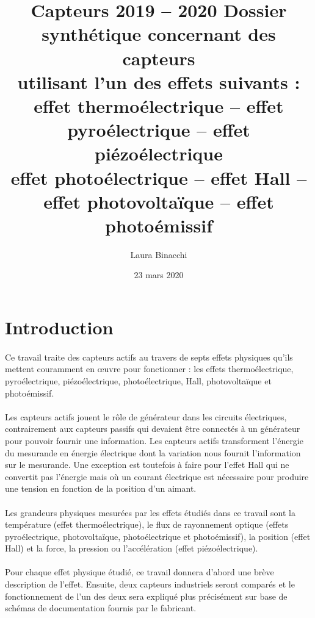 \documentclass{article}
\title{Capteurs 2019 -- 2020\bigbreak \bigbreak
    \large Dossier synthétique concernant des capteurs\\
    utilisant l’un des effets suivants :\bigbreak
    \normalsize effet thermoélectrique -- effet pyroélectrique -- effet piézoélectrique \\
    effet photoélectrique -- effet Hall -- effet photovoltaïque -- effet photoémissif\bigbreak}
\date{23 mars 2020}
\author{Laura Binacchi}
\begin{document}
    \maketitle
    \newpage
    \tableofcontents
    \newpage

    \newpage
    \section*{Introduction}
    \paragraph{}
    Ce travail traite des capteurs actifs au travers de septs effets physiques qu'ils mettent couramment en \oe uvre pour fonctionner : les effets thermoélectrique, pyroélectrique, piézoélectrique, photoélectrique, Hall, photovoltaïque et photoémissif.

    \paragraph{}
    Les capteurs actifs jouent le rôle de générateur dans les circuits électriques, contrairement aux capteurs passifs qui devaient être connectés à un générateur pour pouvoir fournir une information. Les capteurs actifs transforment l'énergie du mesurande en énergie électrique dont la variation nous fournit l'information sur le mesurande. Une exception est toutefois à faire pour l'effet Hall qui ne convertit pas l'énergie mais où un courant électrique est nécessaire pour produire une tension en fonction de la position d'un aimant.

    \paragraph{}
    Les grandeurs physiques mesurées par les effets étudiés dans ce travail sont la température (effet thermoélectrique), le flux de rayonnement optique (effets pyroélectrique, photovoltaïque, photoélectrique et photoémissif), la position (effet Hall) et la force, la pression ou l'accélération (effet piézoélectrique).

    \paragraph{}
    Pour chaque effet physique étudié, ce travail donnera d'abord une brève description de l'effet. Ensuite, deux capteurs industriels seront comparés et le fonctionnement de l'un des deux sera expliqué plus précisément sur base de schémas de documentation fournis par le fabricant.
\end{document}
